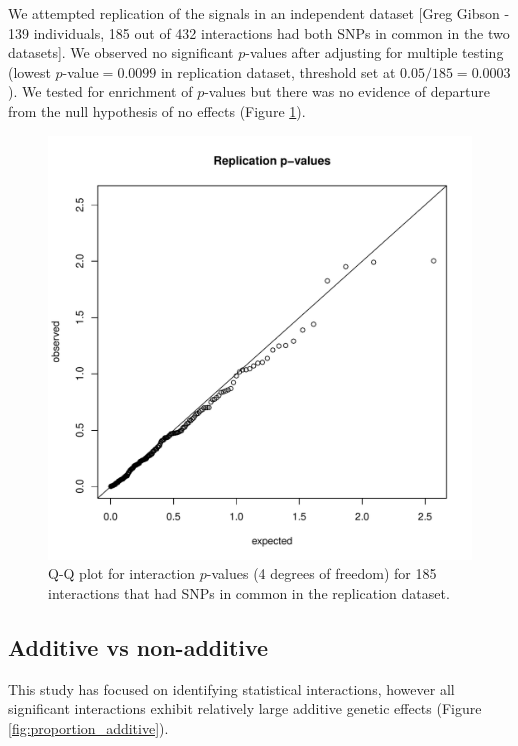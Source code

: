 \documentclass[paper=a4, fontsize=11pt]{scrartcl}	%
\numberwithin{equation}{section}									%
\numberwithin{figure}{section}										%
\numberwithin{table}{section}										%
\begin{document}
We attempted replication of the signals in an independent dataset [Greg Gibson - 139 individuals, 185 out of 432 interactions had both SNPs in common in the two datasets]. We observed no significant $p$-values after adjusting for multiple testing (lowest $p$-value$=0.0099$ in replication dataset, threshold set at $0.05/185=0.0003$). We tested for enrichment of $p$-values but there was no evidence of departure from the null hypothesis of no effects (Figure \ref{fig:gg_replication}). 

\begin{figure}[p]
	\centering
	\includegraphics[width=15cm]{images/replication_qqplot}
	\caption{Q-Q plot for interaction $p$-values (4 degrees of freedom) for 185 interactions that had SNPs in common in the replication dataset.}
	\label{fig:gg_replication}
\end{figure}



\subsection{Additive vs non-additive}

This study has focused on identifying statistical interactions, however all significant interactions exhibit relatively large additive genetic effects (Figure \ref{fig:proportion_additive}).
\end{document}
